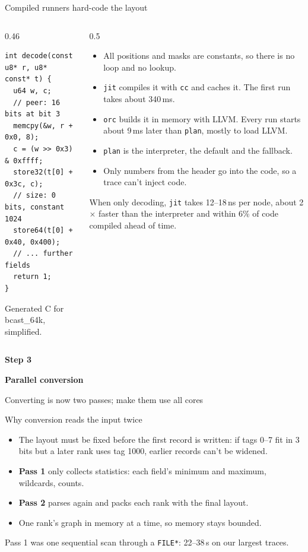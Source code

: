 \documentclass[aspectratio=169,11pt]{beamer}
\newcommand{\diagram}[1]{\resizebox{\linewidth}{!}{}}
\newcommand{\highlight}[1]{\colorbox{cream}{\parbox{\dimexpr\linewidth-2\fboxsep}{\small #1}}}
\newcommand{\stepframe}[3]{%
\begin{frame}
\vfill
{\centering
{\usebeamercolor[fg]{title}\large\bfseries Step #1\par}
\vspace{1mm}
{\usebeamercolor[fg]{title}\huge\bfseries #2\par}
\vspace{3mm}
{\color{black!60}#3\par}
\vspace{9mm}
\def\activestep{#1}%
\resizebox{0.85\linewidth}{!}{}\par}
\vfill
\end{frame}}
\begin{document}
\begin{frame}[fragile]{Compiled runners hard-code the layout}
\begin{columns}[T]
\begin{column}{0.46\textwidth}
\begin{lstlisting}
int decode(const u8* r, u8* const* t) {
  u64 w, c;
  // peer: 16 bits at bit 3
  memcpy(&w, r + 0x0, 8);
  c = (w >> 0x3) & 0xffff;
  store32(t[0] + 0x3c, c);
  // size: 0 bits, constant 1024
  store64(t[0] + 0x40, 0x400);
  // ... further fields
  return 1;
}
\end{lstlisting}
{\scriptsize\color{black!55}Generated C for bcast\_64k, simplified.\par}
\end{column}
\begin{column}{0.5\textwidth}
\small
\begin{itemize}
\item All positions and masks are constants, so there is no loop and no lookup.
\item \texttt{jit} compiles it with \texttt{cc} and caches it. The first run takes about 340\,ms.
\item \texttt{orc} builds it in memory with LLVM. Every run starts about 9\,ms later than \texttt{plan}, mostly to load LLVM.
\item \texttt{plan} is the interpreter, the default and the fallback.
\item Only numbers from the header go into the code, so a trace can't inject code.
\end{itemize}
\vspace{1mm}
\highlight{When only decoding, \texttt{jit} takes 12--18\,ns per node, about 2$\times$ faster than the interpreter and within 6\% of code compiled ahead of time.}
\end{column}
\end{columns}
\end{frame}


\stepframe{3}{Parallel conversion}{Converting is now two passes; make them use all cores}

\begin{frame}{Why conversion reads the input twice}
\diagram{conversion-overview}
\vspace{4mm}
\begin{itemize}
\item The layout must be fixed before the first record is written: if tags 0--7 fit in 3 bits but a later rank uses tag 1000, earlier records can't be widened.
\item \textbf{Pass 1} only collects statistics: each field's minimum and maximum, wildcards, counts.
\item \textbf{Pass 2} parses again and packs each rank with the final layout.
\item One rank's graph in memory at a time, so memory stays bounded.
\end{itemize}
\vspace{2mm}
\highlight{Pass 1 was one sequential scan through a \texttt{FILE*}: 22--38\,s on our largest traces.}
\end{frame}
\end{document}
